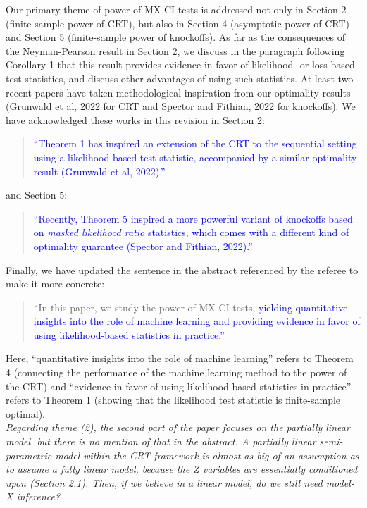 \documentclass[12pt]{article}
\begin{document}
\noindent Our primary theme of power of MX CI tests is addressed not only in Section 2 (finite-sample power of CRT), but also in Section 4 (asymptotic power of CRT) and Section 5 (finite-sample power of knockoffs). As far as the consequences of the Neyman-Pearson result in Section 2, we discuss in the paragraph following Corollary 1 that this result provides evidence in favor of likelihood- or loss-based test statistics, and discuss other advantages of using such statistics. At least two recent papers have taken methodological inspiration from our optimality results (Grunwald et al, 2022 for CRT and Spector and Fithian, 2022 for knockoffs). We have acknowledged these works in this revision in Section 2:
\begin{quote}
	\textcolor{blue}{``Theorem 1 has inspired an extension of the CRT to the sequential setting using a likelihood-based test statistic, accompanied by a similar optimality result (Grunwald et al, 2022).''}
\end{quote}
and Section 5:
\begin{quote}
	\textcolor{blue}{``Recently, Theorem 5 inspired a more powerful variant of knockoffs based on \textit{masked likelihood ratio} statistics, which comes with a different kind of optimality guarantee (Spector and Fithian, 2022).''}
\end{quote}
Finally, we have updated the sentence in the abstract referenced by the referee to make it more concrete:
\begin{quote}
	``In this paper, we study the power of MX CI tests, \textcolor{blue}{yielding quantitative insights into the role of machine learning and providing evidence in favor of using likelihood-based statistics in practice.''}
\end{quote}
Here, ``quantitative insights into the role of machine learning'' refers to Theorem 4 (connecting the performance of the machine learning method to the power of the CRT) and ``evidence in favor of using likelihood-based statistics in practice'' refers to Theorem 1 (showing that the likelihood test statistic is finite-sample optimal).
\\

\textsl{Regarding theme (2), the second part of the paper focuses on the partially linear model, but there is no mention of that in the abstract. A partially linear semi-parametric model within the CRT framework is almost as big of an assumption as to assume a fully linear model, because the Z variables are essentially conditioned upon (Section 2.1). Then, if we believe in a linear model, do we still need model-X inference?}
\\
\end{document}

